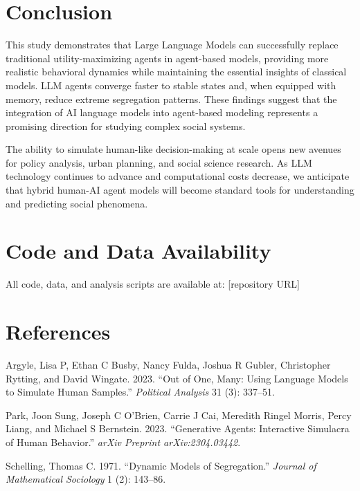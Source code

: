 \documentclass[
  11pt,
]{article}
\newlength{\cslhangindent}
\newenvironment{CSLReferences}[2] %
 {\begin{list}{}{%
  \setlength{\itemindent}{0pt}
  \setlength{\leftmargin}{0pt}
  \setlength{\parsep}{0pt}
  \ifodd #1
   \setlength{\leftmargin}{\cslhangindent}
   \setlength{\itemindent}{-1\cslhangindent}
  \fi
  \setlength{\itemsep}{#2\baselineskip}}}
 {\end{list}}
\begin{document}
\section{Conclusion}\label{conclusion}

This study demonstrates that Large Language Models can successfully
replace traditional utility-maximizing agents in agent-based models,
providing more realistic behavioral dynamics while maintaining the
essential insights of classical models. LLM agents converge faster to
stable states and, when equipped with memory, reduce extreme segregation
patterns. These findings suggest that the integration of AI language
models into agent-based modeling represents a promising direction for
studying complex social systems.

The ability to simulate human-like decision-making at scale opens new
avenues for policy analysis, urban planning, and social science
research. As LLM technology continues to advance and computational costs
decrease, we anticipate that hybrid human-AI agent models will become
standard tools for understanding and predicting social phenomena.

\section{Code and Data Availability}\label{code-and-data-availability}

All code, data, and analysis scripts are available at: {[}repository
URL{]}

\section{References}\label{references}

\label{refs}
\begin{CSLReferences}{1}{0}
Argyle, Lisa P, Ethan C Busby, Nancy Fulda, Joshua R Gubler, Christopher
Rytting, and David Wingate. 2023. {``Out of One, Many: Using Language
Models to Simulate Human Samples.''} \emph{Political Analysis} 31 (3):
337--51.

Park, Joon Sung, Joseph C O'Brien, Carrie J Cai, Meredith Ringel Morris,
Percy Liang, and Michael S Bernstein. 2023. {``Generative Agents:
Interactive Simulacra of Human Behavior.''} \emph{arXiv Preprint
arXiv:2304.03442}.

Schelling, Thomas C. 1971. {``Dynamic Models of Segregation.''}
\emph{Journal of Mathematical Sociology} 1 (2): 143--86.

\end{CSLReferences}
\end{document}
